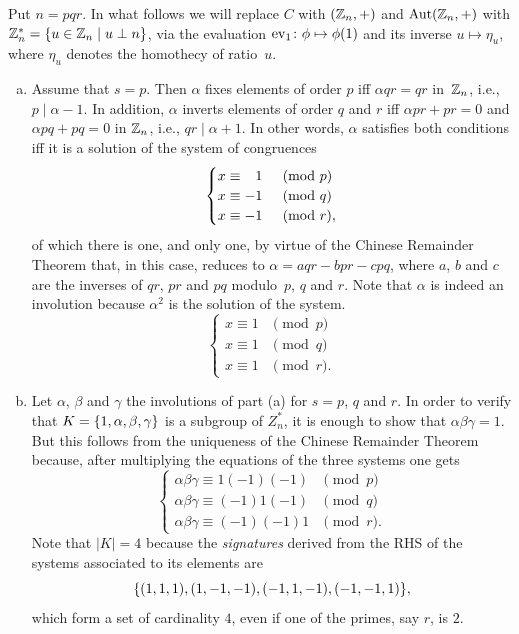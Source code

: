 \begin{solution} Put $n=pqr$. In what follows we will replace $C$ with $(\mathbb{Z}_n,+)$ and ${\rm Aut}(\mathbb{Z}_n,+)$ with $\mathbb{Z}_n^*=\{u\in\mathbb{Z}_n\mid u\perp n\}$, via the evaluation ${\rm ev}_{1}\colon\phi\mapsto\phi(1)$ and its inverse $u\mapsto\eta_u$, where $\eta_u$ denotes the homothecy of ratio~$u$.

\begin{enumerate}[a),font=\upshape]
    \item Assume that $s=p$. Then $\alpha$ fixes elements of order $p$ iff $\alpha qr=qr$ in~$\mathbb{Z}_n$, i.e., $p\mid\alpha-1$. In addition, $\alpha$ inverts elements of order $q$ and $r$ iff $\alpha pr+pr=0$ and $\alpha pq+pq=0$ in $\mathbb{Z}_n$, i.e., $qr\mid\alpha+1$. In other words, $\alpha$ satisfies both conditions iff it is a solution of the system of congruences
    $$
        \begin{cases}
            x\equiv\hphantom-1&{}\pmod p\\
            x\equiv-1&{}\pmod q\\
            x\equiv-1&{}\pmod r,
        \end{cases}
    $$
    of which there is one, and only one, by virtue of the Chinese Remainder Theorem that, in this case, reduces to $\alpha=aqr-bpr-cpq$, where $a$, $b$ and $c$ are the inverses of $qr$, $pr$ and $pq$ modulo~$p$, $q$ and $r$. Note that $\alpha$ is indeed an involution because $\alpha^2$ is the solution of the system.
    $$
        \begin{cases}
            x\equiv1&{}\pmod p\\
            x\equiv1&{}\pmod q\\
            x\equiv1&{}\pmod r.
        \end{cases}
    $$
    
    \item Let $\alpha$, $\beta$ and $\gamma$ the involutions of part (a) for $s=p$, $q$ and $r$. In order to verify that $K=\{1,\alpha,\beta,\gamma\}$ is a subgroup of $Z_n^*$, it is enough to show that $\alpha\beta\gamma=1$. But this follows from the uniqueness of the Chinese Remainder Theorem because, after multiplying the equations of the three systems one gets
        $$
        \begin{cases}
            \alpha\beta\gamma\equiv1(-1)(-1)&{}\pmod p\\
            \alpha\beta\gamma\equiv(-1)1(-1)&{}\pmod q\\
            \alpha\beta\gamma\equiv(-1)(-1)1&{}\pmod r.
        \end{cases}
    $$
    Note that $|K|=4$ because the \textsl{signatures\/} derived from the RHS of the systems associated to its elements are
    $$
        \{(1,1,1), (1,-1,-1), (-1,1,-1), (-1,-1,1)\},
    $$
    which form a set of cardinality $4$, even if one of the primes, say $r$, is $2$. 


\end{enumerate}
\end{solution}
